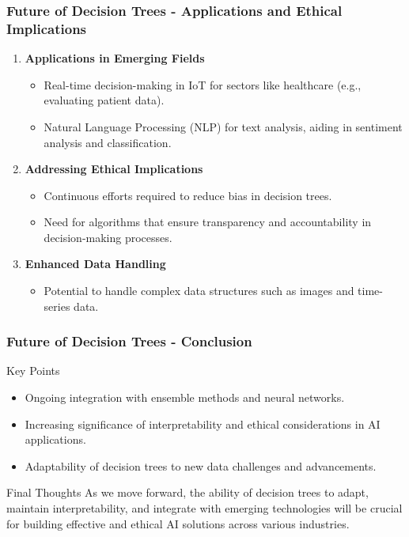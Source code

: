 \documentclass[aspectratio=169]{beamer}
\begin{document}
\begin{frame}[fragile]
    \frametitle{Future of Decision Trees - Applications and Ethical Implications}
    \begin{enumerate}
        \item \textbf{Applications in Emerging Fields}
            \begin{itemize}
                \item Real-time decision-making in IoT for sectors like healthcare (e.g., evaluating patient data).
                \item Natural Language Processing (NLP) for text analysis, aiding in sentiment analysis and classification.
            \end{itemize}

        \item \textbf{Addressing Ethical Implications}
            \begin{itemize}
                \item Continuous efforts required to reduce bias in decision trees.
                \item Need for algorithms that ensure transparency and accountability in decision-making processes.
            \end{itemize}
        
        \item \textbf{Enhanced Data Handling}
            \begin{itemize}
                \item Potential to handle complex data structures such as images and time-series data.
            \end{itemize}
    \end{enumerate}
\end{frame}

\begin{frame}[fragile]
    \frametitle{Future of Decision Trees - Conclusion}
    \begin{block}{Key Points}
        \begin{itemize}
            \item Ongoing integration with ensemble methods and neural networks.
            \item Increasing significance of interpretability and ethical considerations in AI applications.
            \item Adaptability of decision trees to new data challenges and advancements.
        \end{itemize}
    \end{block}
    
    \begin{block}{Final Thoughts}
        As we move forward, the ability of decision trees to adapt, maintain interpretability, and integrate with emerging technologies will be crucial for building effective and ethical AI solutions across various industries.
    \end{block}
\end{frame}
\end{document}
